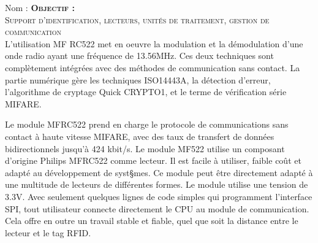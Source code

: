 \documentclass[a4paper, 11pt]{article}           %
\newcounter{Q}
\newcommand{\objectif}[1]{\textsc{\huge \textbf{Objectif :}\\[2mm] #1} }
\begin{document}
\sffamily
\hfill Nom : {\noindent\makebox[5cm]{\dotfill}\endgraf}
\objectif{Support d'identification, lecteurs, unités de traitement, gestion de communication}\\


L'utilisation MF RC522 met en oeuvre la modulation et la démodulation d'une onde radio ayant une fréquence de 13.56MHz. Ces deux techniques sont complètement intégrées avec des méthodes de communication sans contact. La partie numérique gère les techniques ISO14443A, la détection d'erreur, l'algorithme de cryptage Quick CRYPTO1, et le terme de vérification série MIFARE.

Le module MFRC522 prend en charge le protocole  de communications sans contact à haute vitesse MIFARE, avec des taux de transfert de données bidirectionnels jusqu'à 424 kbit/s. Le module MF522 utilise un composant d'origine Philips MFRC522 comme lecteur. Il est facile à utiliser, faible coût et adapté au développement de syst§mes. Ce module peut être directement adapté à une multitude de lecteurs de différentes formes. Le module utilise une tension de 3.3V. Avec seulement quelques lignes de code simples qui programment l'interface SPI, tout utilisateur connecte directement le CPU au module de communication. Cela offre en outre un travail stable et fiable, quel que soit la distance entre le lecteur et le tag RFID.\\
\end{document}
